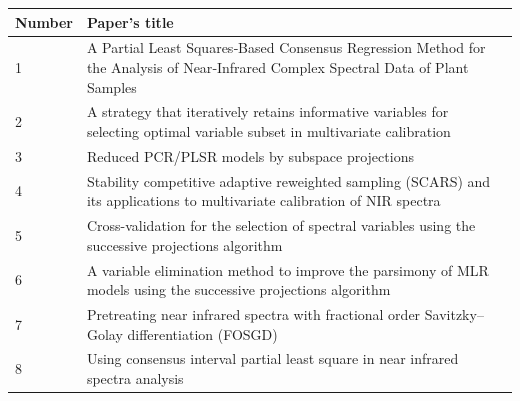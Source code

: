 \documentclass[a4paper,12pt,titlepage]{article} %
\numberwithin{equation}{section}  %
\begin{document}
	\begin{landscape}
		
		\begin{table}[]
			\begin{tabular}{ll}
				\hline
				Number & Paper's title                                                                                                                          \\ \hline
				1      & A Partial Least Squares‐Based Consensus Regression Method for the Analysis of Near‐Infrared Complex Spectral Data of Plant Samples \\
				2      & A strategy that iteratively retains informative variables for selecting optimal variable subset in multivariate calibration            \\
				3      & Reduced PCR/PLSR models by subspace projections                                                                                        \\
				4      & Stability competitive adaptive reweighted sampling (SCARS) and its applications to multivariate calibration of NIR spectra             \\
				5      & Cross-validation for the selection of spectral variables using the successive projections algorithm                                    \\
				6      & A variable elimination method to improve the parsimony of MLR models using the successive projections algorithm                        \\
				7      & Pretreating near infrared spectra with fractional order Savitzky–Golay differentiation (FOSGD)                                       \\
				8      & Using consensus interval partial least square in near infrared spectra analysis                                                        
			\end{tabular}
			
			\label{tab:papers}
		\end{table}
		
	\end{landscape}
	
\end{document}
